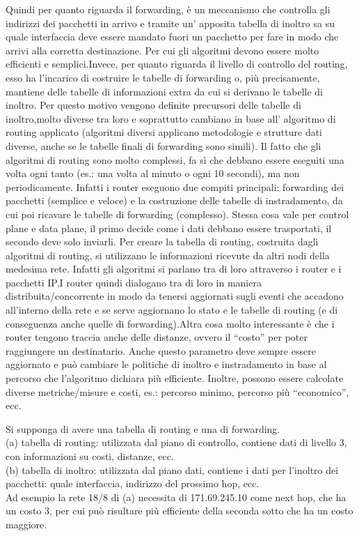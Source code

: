 Quindi per quanto riguarda il forwarding, è un meccanismo che controlla gli indirizzi dei pacchetti in arrivo e tramite un’ apposita tabella di inoltro sa su quale interfaccia deve essere mandato fuori un pacchetto per fare in modo che arrivi alla corretta destinazione. Per cui gli algoritmi devono essere molto efficienti e semplici.Invece, per quanto riguarda il livello di controllo del routing, esso ha l’incarico di costruire le tabelle di forwarding o, più precisamente, mantiene delle tabelle di informazioni extra da cui si derivano le tabelle di inoltro. Per questo motivo vengono definite precursori delle tabelle di inoltro,molto diverse tra loro e soprattutto cambiano in base all’ algoritmo di routing applicato (algoritmi diversi applicano metodologie e strutture dati diverse, anche se le tabelle finali di forwarding sono simili). Il fatto che gli algoritmi di routing sono molto complessi, fa sì che debbano essere eseguiti una volta ogni tanto (es.: una volta al minuto o ogni 10 secondi), ma non periodicamente. Infatti i router eseguono due compiti principali: forwarding dei pacchetti (semplice e veloce) e la costruzione delle tabelle di instradamento, da cui poi ricavare le tabelle di forwarding (complesso).  Stessa cosa vale per control plane e data plane, il primo decide come i dati debbano essere trasportati, il secondo deve solo inviarli. Per creare la tabella di routing, costruita dagli algoritmi di routing, si utilizzano le informazioni ricevute da altri nodi della medesima rete. Infatti gli algoritmi si parlano tra di loro attraverso i router e i pacchetti IP.I router quindi dialogano tra di loro in maniera distribuita/concorrente in modo da tenersi aggiornati sugli eventi che accadono all’interno della rete e se serve aggiornano lo stato e le tabelle di routing (e di conseguenza anche quelle di forwarding).Altra cosa molto interessante è che i router tengono traccia anche delle distanze, ovvero il “costo” per poter raggiungere un destinatario. Anche questo parametro deve sempre essere aggiornato e può cambiare le politiche di inoltro e instradamento in base al percorso che l’algoritmo dichiara più efficiente. Inoltre, possono essere calcolate diverse metriche/misure e costi, es.: percorso minimo, percorso più “economico”, ecc.
\begin{example}
  Si supponga di avere una tabella di routing e una di forwarding. \\
  (a) tabella di routing: utilizzata dal piano di controllo, contiene dati di livello 3, con informazioni su costi, distanze, ecc. \\
  (b) tabella di inoltro: utilizzata dal piano dati, contiene i dati per l’inoltro dei pacchetti: quale interfaccia, indirizzo del prossimo hop, ecc. \\
  Ad esempio la rete 18/8 di (a) necessita di 171.69.245.10 come next hop, che ha un costo 3, per cui può risultare più efficiente della seconda sotto che ha un costo maggiore.
\end{example}
